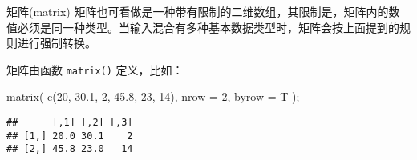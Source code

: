 \documentclass[ignorenonframetext,]{beamer}
\newenvironment{Shaded}{\begin{snugshade}}{\end{snugshade}}
\newcommand{\AttributeTok}[1]{\textcolor[rgb]{0.77,0.63,0.00}{#1}}
\newcommand{\DecValTok}[1]{\textcolor[rgb]{0.00,0.00,0.81}{#1}}
\newcommand{\FloatTok}[1]{\textcolor[rgb]{0.00,0.00,0.81}{#1}}
\newcommand{\FunctionTok}[1]{\textcolor[rgb]{0.00,0.00,0.00}{#1}}
\newcommand{\NormalTok}[1]{#1}
\newcommand\FontSmall{\fontsize{7}{8}\selectfont}
\begin{document}
\begin{frame}[fragile]{矩阵(matrix)}
\protect\hypertarget{ux77e9ux9635matrix}{}
矩阵也可看做是一种带有限制的二维数组，其限制是，矩阵内的数值必须是同一种类型。当输入混合有多种基本数据类型时，矩阵会按上面提到的规则进行强制转换。

矩阵由函数 \texttt{matrix()} 定义，比如：

\FontSmall

\begin{Shaded}
\begin{Highlighting}[]
\FunctionTok{matrix}\NormalTok{( }\FunctionTok{c}\NormalTok{(}\DecValTok{20}\NormalTok{, }\FloatTok{30.1}\NormalTok{, }\DecValTok{2}\NormalTok{, }\FloatTok{45.8}\NormalTok{, }\DecValTok{23}\NormalTok{, }\DecValTok{14}\NormalTok{), }\AttributeTok{nrow =} \DecValTok{2}\NormalTok{, }\AttributeTok{byrow =}\NormalTok{ T );}
\end{Highlighting}
\end{Shaded}

\begin{verbatim}
##      [,1] [,2] [,3]
## [1,] 20.0 30.1    2
## [2,] 45.8 23.0   14
\end{verbatim}
\end{frame}
\end{document}
